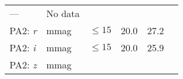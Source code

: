 \documentclass[DM,lsstdraft,toc]{lsstdoc}
\begin{document}
\begin{longtable}[]{@{}llllll@{}}
\begin{minipage}[t]{0.12\columnwidth}
---\strut
\end{minipage} & \begin{minipage}[t]{0.17\columnwidth}\raggedright\strut
No data\strut
\end{minipage}\tabularnewline
\begin{minipage}[t]{0.14\columnwidth}\raggedright\strut
PA2: \emph{r}\strut
\end{minipage} & \begin{minipage}[t]{0.06\columnwidth}\raggedright\strut
mmag\strut
\end{minipage} & \begin{minipage}[t]{0.17\columnwidth}\raggedright\strut
\(\leq 15\)\strut
\end{minipage} & \begin{minipage}[t]{0.17\columnwidth}\raggedright\strut
20.0\strut
\end{minipage} & \begin{minipage}[t]{0.12\columnwidth}\raggedright\strut
27.2\strut
\end{minipage} & \begin{minipage}[t]{0.17\columnwidth}\raggedright\strut
\strut
\end{minipage}\tabularnewline
\begin{minipage}[t]{0.14\columnwidth}\raggedright\strut
PA2: \emph{i}\strut
\end{minipage} & \begin{minipage}[t]{0.06\columnwidth}\raggedright\strut
mmag\strut
\end{minipage} & \begin{minipage}[t]{0.17\columnwidth}\raggedright\strut
\(\leq 15\)\strut
\end{minipage} & \begin{minipage}[t]{0.17\columnwidth}\raggedright\strut
20.0\strut
\end{minipage} & \begin{minipage}[t]{0.12\columnwidth}\raggedright\strut
25.9\strut
\end{minipage} & \begin{minipage}[t]{0.17\columnwidth}\raggedright\strut
\strut
\end{minipage}\tabularnewline
\begin{minipage}[t]{0.14\columnwidth}\raggedright\strut
PA2: \emph{z}\strut
\end{minipage} & \begin{minipage}[t]{0.06\columnwidth}\raggedright\strut
mmag\strut
\end{minipage} & \begin{minipage}[t]{0.17\columnwidth}\raggedright\strut

\end{minipage}
\end{longtable}
\end{document}
